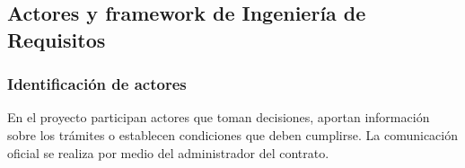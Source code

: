 \documentclass[12pt,a4paper]{article}
\renewcommand{\arraystretch}{1.3}
\begin{document}
\subsection{Actores y framework de Ingeniería de Requisitos}

\subsubsection{Identificación de actores}

En el proyecto participan actores que toman decisiones, aportan
información sobre los trámites o establecen condiciones que
deben cumplirse. La comunicación oficial se realiza por
medio del administrador del contrato.

\begingroup
\footnotesize
\setlength{\tabcolsep}{3pt}
\renewcommand{\arraystretch}{1.1}
\end{document}
